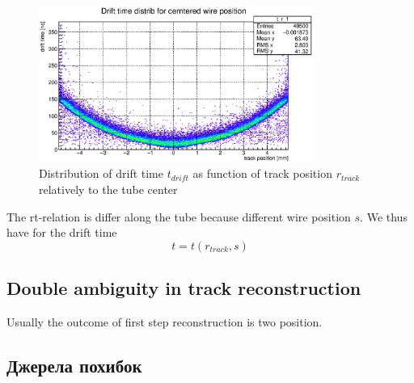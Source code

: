 \documentclass[]{article}
\begin{document}
	\begin{figure}[h]
	\includegraphics[width=0.8\textwidth]{t_r_distr_00.eps}
	\centering
	\caption{ Distribution of drift time $t_{drift}$ as function of track position $r_{track}$ relatively to the tube center} 
	\label{fig:t_r_distr_00}
	\end{figure}
		
	The rt-relation is differ along the tube because different wire position $s$. We thus have for the drift time 
	\begin{equation}
	t = t(r_{track},s)
	\end{equation}
	
	\subsection{ Double ambiguity in track reconstruction}
	Usually the outcome of first step reconstruction is two position.
	
	
	
	\subsection{Джерела похибок}
	
\end{document}
